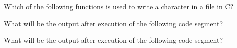 \documentclass[11pt]{examdesign}
\begin{document}
\begin{multiplechoice}[title={},suppressprefix=yes,rearrange=no]
\begin{question}
Which of the following functions is used to write a character in a file in C?
\end{question}

\begin{question}
What will be the output after execution of the following code segment?
\end{question}
  
\begin{question}
What will be the output after execution of the following code segment?
\end{question}

\end{multiplechoice}
\end{document}
